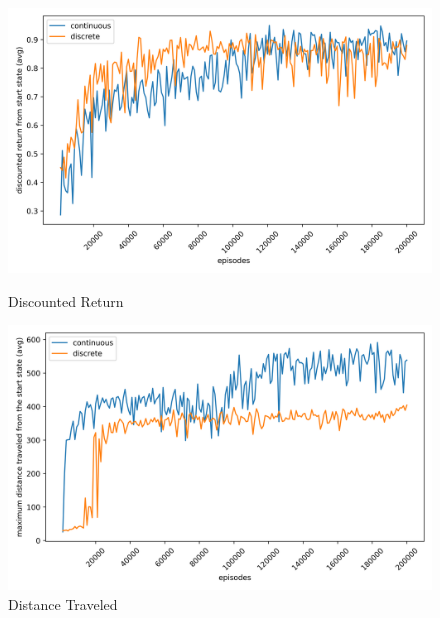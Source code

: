 \begin{figure}[H]
    \centering
    \begin{minipage}{0.49\linewidth}
        \centering
        \includegraphics[width=\linewidth]{plots/part2-rewards.png}
        \caption{Discounted Return}
    \end{minipage}
    \hfill
    \begin{minipage}{0.49\linewidth}
        \centering
        \includegraphics[width=\linewidth]{plots/part2-distances.png}
        \caption{Distance Traveled}
        \label{fig:part2-distance}
    \end{minipage}


\end{figure}
